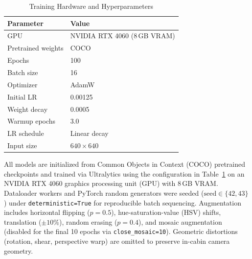 \documentclass[conference]{IEEEtran}
\begin{document}
\begin{table}[htbp]
\caption{Training Hardware and Hyperparameters}
\label{tab:training_config}
\begin{center}
\begin{tabular}{|l|l|}
\hline
\textbf{Parameter} & \textbf{Value} \\
\hline
GPU                & NVIDIA RTX 4060 (8\,GB VRAM) \\
Pretrained weights & COCO \\
Epochs             & 100 \\
Batch size         & 16 \\
Optimizer          & AdamW \\
Initial LR         & 0.00125 \\
Weight decay       & 0.0005 \\
Warmup epochs      & 3.0 \\
LR schedule        & Linear decay \\
Input size         & $640 \times 640$ \\
\hline
\end{tabular}
\end{center}
\end{table}

All models are initialized from Common Objects in Context (COCO) pretrained checkpoints and trained via Ultralytics using the configuration in Table~\ref{tab:training_config} on an NVIDIA RTX 4060 graphics processing unit (GPU) with 8\,GB VRAM. Dataloader workers and PyTorch random generators were seeded ($\text{seed} \in \{42, 43\}$) under \texttt{deterministic=True} for reproducible batch sequencing. Augmentation includes horizontal flipping ($p = 0.5$), hue-saturation-value (HSV) shifts, translation ($\pm 10\%$), random erasing ($p = 0.4$), and mosaic augmentation (disabled for the final 10 epochs via \texttt{close\_mosaic=10}). Geometric distortions (rotation, shear, perspective warp) are omitted to preserve in-cabin camera geometry.
\end{document}
